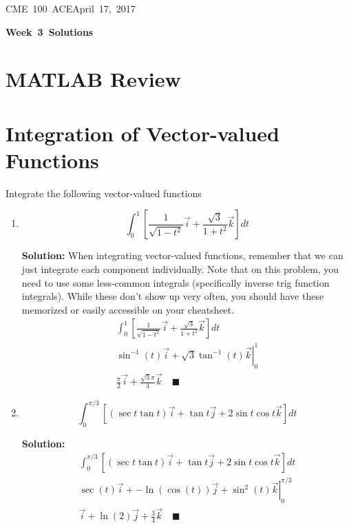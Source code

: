 \documentclass[letterpaper, 11pt]{article}
\makeatletter
\newcommand{\hmwkTitle}{Week\ 3\ Solutions} %
\newcommand{\hmwkClass}{CME\ 100\ ACE} %
\newcommand{\hmwkAuthorName}{Timothy Anderson} %
\newcommand{\hmwkAuthorEmail}{timmya@stanford.edu} %
\makeatother
\begin{document}
\noindent
\normalsize 
\hmwkClass \hfill April\ 17,\ 2017\\

\begin{center} \Large \textbf{\hmwkTitle} \end{center}

\section{MATLAB Review}


\section{Integration of Vector-valued Functions}
Integrate the following vector-valued functions
\begin{enumerate}[label=(\alph*)]
\item \[ \int_0^1 \left[ \frac{1}{\sqrt{1 - t^2}} \vec i + \frac{\sqrt{3}}{1 + t^2} \vec k \right] dt \]
\par \textbf{Solution:} When integrating vector-valued functions, remember that we can just integrate each component individually. Note that on this problem, you need to use some less-common integrals (specifically inverse trig function integrals). While these don't show up very often, you should have these memorized or easily accessible on your cheatsheet. 
\begin{gather*}
\int_0^1 \left[ \frac{1}{\sqrt{1 - t^2}} \vec i + \frac{\sqrt{3}}{1 + t^2} \vec k \right] dt \\
\left. \sin^{-1}(t) \vec i + \sqrt{3} \tan^{-1}(t) \vec k \right|_0^1  \\
\frac{\pi}{2} \vec i + \frac{\sqrt{3}\pi}{4} \vec k \quad\blacksquare
\end{gather*}


\item \[ \int_0^{\pi/3} \left[ (\sec t \tan t) \vec i + \tan t \vec j + 2 \sin t \cos t \vec k \right] dt \]
\par \textbf{Solution:}
\begin{gather*}
\int_0^{\pi/3} \left[ (\sec t \tan t) \vec i + \tan t \vec j + 2 \sin t \cos t \vec k \right] dt \\
 \left. \sec (t) \vec i + -\ln(\cos(t)) \vec j + \sin^2( t)  \vec k \right|_0^{\pi/3} \\
 \vec i + \ln(2) \vec j + \frac{3}{4} \vec k \quad \blacksquare
\end{gather*}

\end{enumerate}
\end{document}
